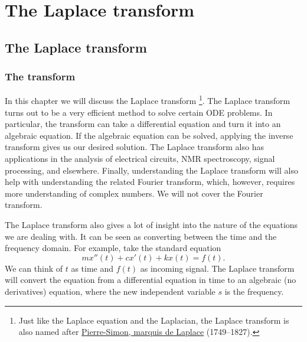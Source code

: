 \chapter{The Laplace transform} \label{LT:chapter}


\section{The Laplace transform}
\label{laplace:section}


\subsection{The transform}

In this chapter we will discuss the Laplace transform%
\footnote{Just like the Laplace equation and the Laplacian, the Laplace
transform is also named after 
\href{https://en.wikipedia.org/wiki/Laplace}{Pierre-Simon, marquis de Laplace}
(1749--1827).}.
The Laplace transform
turns out to be a very efficient method to solve certain ODE problems.  In
particular, the transform can take a differential equation and turn it into
an algebraic equation.  If the algebraic equation can be solved, applying the
inverse transform gives us our desired solution.
The Laplace transform also has applications in
the analysis of 
electrical circuits, NMR spectroscopy, signal processing, and elsewhere.
Finally,
understanding the Laplace
transform will also help with understanding the related Fourier transform,
which, however, requires more
understanding of complex numbers.  We will not cover the Fourier transform.

The Laplace transform also gives a lot of insight into the nature of the
equations we are dealing with.  It can be seen as converting between the time
and the frequency domain.  For example, take the standard equation
\begin{equation*}
m x''(t) + c x'(t) + k x(t) = f(t) .
\end{equation*}
We can think of $t$ as time and $f(t)$ as incoming signal.  The Laplace
transform will convert the equation from a differential equation in time to
an algebraic (no derivatives) equation, where the new independent variable
$s$ is the frequency.

